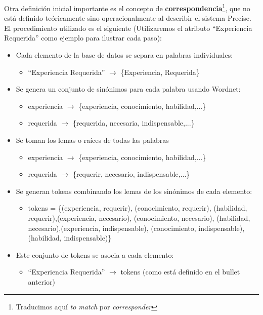 Otra definición inicial importante es el concepto de \textbf{correspondencia}\footnote{Traducimos aquí \textit{to match} por \textit{corresponder}}, que no está definido teóricamente sino operacionalmente al describir el sistema Precise. El procedimiento utilizado es el siguiente (Utilizaremos el atributo “Experiencia Requerida” como ejemplo para ilustrar cada paso):

\begin{itemize}
  \item Cada elemento de la base de datos se separa en palabras individuales:
  \begin{itemize}
    \item “Experiencia Requerida” $\rightarrow$ \{Experiencia, Requerida\}
  \end{itemize}
  \item Se genera un conjunto de sinónimos para cada palabra usando Wordnet:
  \begin{itemize}
    \item experiencia $\rightarrow$ \{experiencia, conocimiento, habilidad,...\}
    \item requerida $\rightarrow$ \{requerida, necesaria, indispensable,...\}
  \end{itemize}
  \item Se toman los lemas o raíces de todas las palabras
    \begin{itemize}
      \item experiencia $\rightarrow$ \{experiencia, conocimiento, habilidad,...\}
      \item requerida $\rightarrow$ \{requerir, necesario, indispensable,...\}
  \end{itemize}
  \item Se generan tokens combinando los lemas de los sinónimos de cada elemento:
  \begin{itemize}
      \item tokens = \{(experiencia, requerir), (conocimiento, requerir), (habilidad, requerir),(experiencia, necesario), (conocimiento, necesario), (habilidad, necesario),(experiencia, indispensable), (conocimiento, indispensable), (habilidad, indispensable)\}
  \end{itemize}
  \item Este conjunto de tokens se asocia a cada elemento:
  \begin{itemize}
    \item “Experiencia Requerida” $\rightarrow$ tokens (como está definido en el bullet anterior)
  \end{itemize}
\end{itemize}

